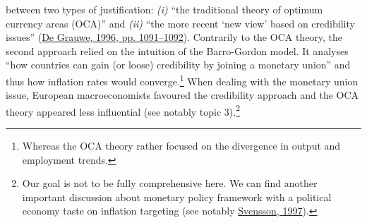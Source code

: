 \documentclass[
  12pt,
  onecolumn]{article}
\begin{document}
between two types of justification: \emph{(i)} ``the traditional theory
of optimum currency areas (OCA)'' and \emph{(ii)} ``the more recent `new
view' based on credibility issues''
(\protect\hyperlink{ref-degrauwe1996}{De Grauwe, 1996, pp. 1091--1092}).
Contrarily to the OCA theory, the second approach relied on the
intuition of the Barro-Gordon model. It analyses ``how countries can
gain (or loose) credibility by joining a monetary union'' and thus how
inflation rates would converge.\footnote{Whereas the OCA theory rather
  focused on the divergence in output and employment trends.} When
dealing with the monetary union issue, European macroeconomists favoured
the credibility approach and the OCA theory appeared less influential
(see notably topic 3).\footnote{Our goal is not to be fully
  comprehensive here. We can find another important discussion about
  monetary policy framework with a political economy taste on inflation
  targeting (see notably \protect\hyperlink{ref-svensson1997}{Svensson,
  1997}).}
\end{document}
